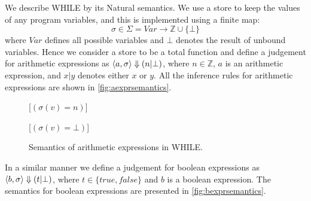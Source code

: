 We describe WHILE by its Natural semantics.
We use a store to keep the values of any program variables, and this is implemented using a finite map:
$$\sigma \in \Sigma = Var \longrightarrow \mathbb{Z} \cup \{\bot\}$$
where $Var$ defines all possible variables and $\bot$ denotes the result of unbound variables.
Hence we consider a store to be a total function and define a judgement for arithmetic expressions as
$\langle a,\sigma \rangle \Downarrow (n | \bot)$, where $n \in \mathbb{Z}$, $a$ is an arithmetic expression, and $x | y$ denotes either $x$ or $y$.
All the inference rules for arithmetic expressions are shown in \autoref{fig:aexprsemantics}.

\begin{figure}[h!]
\inference[ACst]{}
{}

\inference[Var]{}
{}[$(\sigma(v) = n)$]

{}[$( \sigma(v) = \bot )$]

{}

{}

{}

\label{fig:aexprsemantics}
\caption{Semantics of arithmetic expressions in WHILE.}
\end{figure}

In a similar manner we define a judgement for boolean expressions as $\langle b,\sigma \rangle \Downarrow (t | \bot)$, where $t \in \{true, false\}$ and $b$ is a boolean expression.
The semantics for boolean expressions are presented in \autoref{fig:bexprsemantics}.

